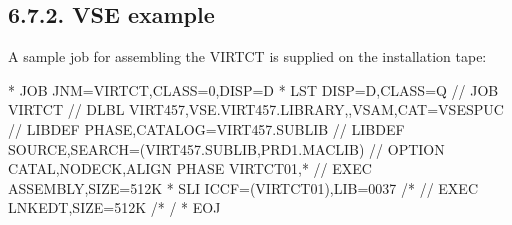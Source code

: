 \documentclass[letterpaper,10pt,english]{sphinxmanual}
\begin{document}
\begin{sphinxVerbatim}[commandchars=\\\{\}]
 
  
  
  
  
  
 
  
\end{sphinxVerbatim}



\subsection{6.7.2. VSE example}
\label{\detokenize{Installation_Guide:vse-example}}
A sample job for assembling the VIRTCT is supplied on the installation tape:

\begin{sphinxVerbatim}[commandchars=\\\{\}]
* \PYGZdl{}\PYGZdl{} JOB JNM=VIRTCT,CLASS=0,DISP=D
* \PYGZdl{}\PYGZdl{} LST DISP=D,CLASS=Q
// JOB VIRTCT
// DLBL VIRT457,\PYGZsq{}VSE.VIRT457.LIBRARY\PYGZsq{},,VSAM,CAT=VSESPUC
// LIBDEF PHASE,CATALOG=VIRT457.SUBLIB
// LIBDEF SOURCE,SEARCH=(VIRT457.SUBLIB,PRD1.MACLIB)
// OPTION CATAL,NODECK,ALIGN
        PHASE VIRTCT01,*
// EXEC ASSEMBLY,SIZE=512K
* \PYGZdl{}\PYGZdl{} SLI ICCF=(VIRTCT01),LIB=0037
/*
// EXEC LNKEDT,SIZE=512K
/*
/\PYGZam{}
* \PYGZdl{}\PYGZdl{} EOJ
\end{sphinxVerbatim}

\end{document}
